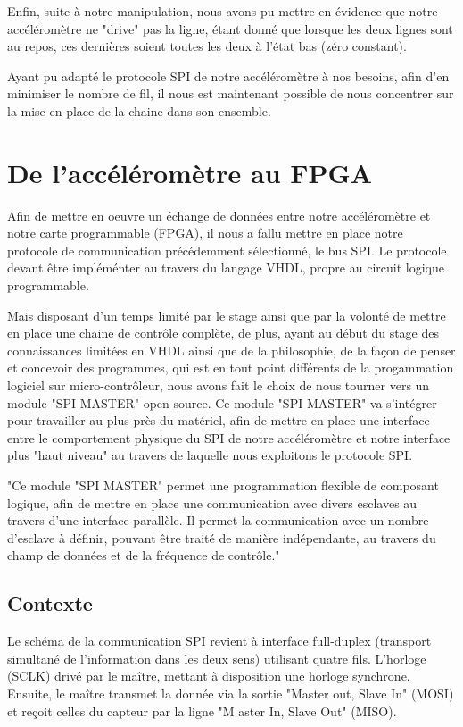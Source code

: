 \documentclass[french,a4paper,12pt]{report}
\begin{document}
	Enfin, suite à notre manipulation, nous avons pu mettre en évidence que notre accéléromètre ne "drive" pas la ligne, étant donné que lorsque les deux lignes sont au repos, ces dernières soient toutes les deux à l'état bas (zéro constant).
	
	Ayant pu adapté le protocole SPI de notre accéléromètre à nos besoins, afin d'en minimiser le nombre de fil, il nous est maintenant possible de nous concentrer sur la mise en place de la chaine dans son ensemble.
	
	\chapter{De l'accéléromètre au FPGA}
	
		Afin de mettre en oeuvre un échange de données entre notre accéléromètre et notre carte programmable (FPGA), il nous a fallu mettre en place notre protocole de communication précédemment sélectionné, le bus SPI. Le protocole devant être impléménter au travers du langage VHDL, propre au circuit logique programmable.
		
		Mais disposant d'un temps limité par le stage ainsi que par la volonté de mettre en place une chaine de contrôle complète, de plus, ayant au début du stage des connaissances limitées en VHDL ainsi que de la philosophie, de la façon de penser et concevoir des programmes, qui est en tout point différents de la progammation logiciel sur micro-contrôleur, nous avons fait le choix de nous tourner vers un module "SPI MASTER" open-source.		
		Ce module "SPI MASTER" va s'intégrer pour travailler au plus près du matériel, afin de mettre en place une interface entre le comportement physique du SPI de notre accéléromètre et notre interface plus "haut niveau" au travers de laquelle nous exploitons le protocole SPI.
		
		"Ce module "SPI MASTER" permet une programmation flexible de composant logique, afin de mettre en place une communication avec divers esclaves au travers d'une interface parallèle. Il permet la communication avec un nombre d'esclave à définir, pouvant être traité de manière indépendante, au travers du champ de données et de la fréquence de contrôle."
		
		\section{Contexte}
			Le schéma de la communication SPI revient à interface full-duplex (transport simultané de l'information dans les deux sens) utilisant quatre fils. L'horloge (SCLK) drivé par le maître, mettant à disposition une horloge synchrone. Ensuite, le maître transmet la donnée via la sortie "Master out, Slave In" (MOSI) et reçoit celles du capteur par la ligne "M	aster In, Slave Out" (MISO).
			
\end{document}
